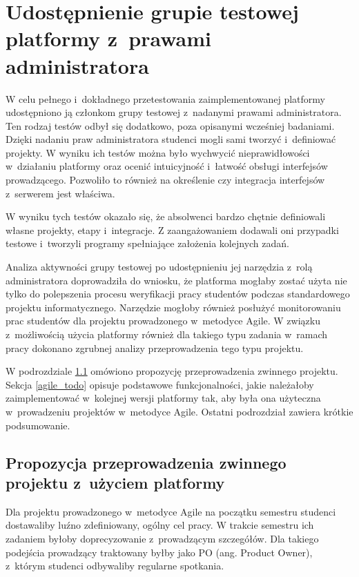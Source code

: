 \section{Udostępnienie grupie testowej platformy z~prawami administratora}

W celu pełnego i~dokładnego przetestowania zaimplementowanej platformy udostępniono ją członkom grupy testowej z~nadanymi prawami administratora.
Ten rodzaj testów odbył się dodatkowo, poza opisanymi wcześniej badaniami.
Dzięki nadaniu praw administratora studenci mogli sami tworzyć i~definiować projekty.
W wyniku ich testów można było wychwycić nieprawidłowości w~działaniu platformy oraz ocenić intuicyjność i~łatwość obsługi interfejsów prowadzącego.
Pozwoliło to również na określenie czy integracja interfejsów z~serwerem jest właściwa.

W wyniku tych testów okazało się, że absolwenci bardzo chętnie definiowali własne projekty, etapy i~integracje.
Z zaangażowaniem dodawali oni przypadki testowe i~tworzyli programy spełniające założenia kolejnych zadań.

Analiza aktywności grupy testowej po udostępnieniu jej narzędzia z~rolą administratora doprowadziła do wniosku, że platforma mogłaby zostać użyta nie tylko do polepszenia procesu weryfikacji pracy studentów podczas standardowego projektu informatycznego.
Narzędzie mogłoby również posłużyć monitorowaniu prac studentów dla projektu prowadzonego w~metodyce Agile.
W związku z~możliwością użycia platformy również dla takiego typu zadania w~ramach pracy dokonano zgrubnej analizy przeprowadzenia tego typu projektu.

W podrozdziale \ref{agile_proposition} omówiono propozycję przeprowadzenia zwinnego projektu.
Sekcja \ref{agile_todo} opisuje podstawowe funkcjonalności, jakie należałoby zaimplementować w~kolejnej wersji platformy tak, aby była ona użyteczna w~prowadzeniu projektów w~metodyce Agile.
Ostatni podrozdział zawiera krótkie podsumowanie.

\subsection{Propozycja przeprowadzenia zwinnego projektu z~użyciem platformy}
\label{agile_proposition}

Dla projektu prowadzonego w~metodyce Agile na początku semestru studenci dostawaliby luźno zdefiniowany, ogólny cel pracy.
W trakcie semestru ich zadaniem byłoby doprecyzowanie z~prowadzącym szczegółów.
Dla takiego podejścia prowadzący traktowany byłby jako PO (ang. Product Owner), z~którym studenci odbywaliby regularne spotkania.

